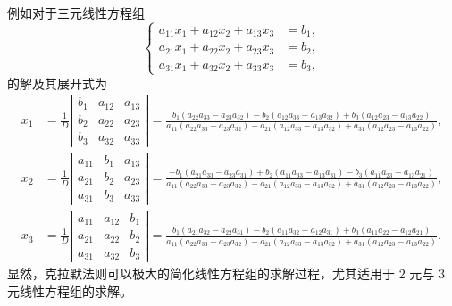 例如对于三元线性方程组
\begin{equation*}
    \left\{ \begin{aligned}
        a_{11} x_1 + a_{12} x_2 + a_{13} x_3 & = b_1 , \\
        a_{21} x_1 + a_{22} x_2 + a_{23} x_3 & = b_2 , \\
        a_{31} x_1 + a_{32} x_2 + a_{33} x_3 & = b_3 ,
    \end{aligned} \right.
\end{equation*}
的解及其展开式为
\begin{equation*}
    \begin{aligned}
        x_1 & = \frac{1}{D} \left| \begin{array}{ccc}
                                       b_1 & a_{12} & a_{13} \\
                                       b_2 & a_{22} & a_{23} \\
                                       b_3 & a_{32} & a_{33}
                                   \end{array} \right| = \frac{b_1 (a_{22} a_{33} - a_{23} a_{32}) - b_2 (a_{12} a_{33} - a_{13} a_{32}) + b_3 (a_{12} a_{23} - a_{13} a_{22})}{a_{11} (a_{22} a_{33} - a_{23} a_{32}) - a_{21} (a_{12} a_{33} - a_{13} a_{32}) + a_{31} (a_{12} a_{23} - a_{13} a_{22})} ,  \\
        x_2 & = \frac{1}{D} \left| \begin{array}{ccc}
                                       a_{11} & b_1 & a_{13} \\
                                       a_{21} & b_2 & a_{23} \\
                                       a_{31} & b_3 & a_{33}
                                   \end{array} \right| = \frac{-b_1 (a_{21} a_{33} - a_{23} a_{31}) + b_2 (a_{11} a_{33} - a_{13} a_{31}) - b_3 (a_{11} a_{23} - a_{13} a_{21})}{a_{11} (a_{22} a_{33} - a_{23} a_{32}) - a_{21} (a_{12} a_{33} - a_{13} a_{32}) + a_{31} (a_{12} a_{23} - a_{13} a_{22})} , \\
        x_3 & = \frac{1}{D} \left| \begin{array}{ccc}
                                       a_{11} & a_{12} & b_1 \\
                                       a_{21} & a_{22} & b_2 \\
                                       a_{31} & a_{32} & b_3
                                   \end{array} \right| = \frac{b_1 (a_{21} a_{32} - a_{22} a_{31}) - b_2 (a_{11} a_{32} - a_{12} a_{31}) + b_3 (a_{11} a_{22} - a_{12} a_{21})}{a_{11} (a_{22} a_{33} - a_{23} a_{32}) - a_{21} (a_{12} a_{33} - a_{13} a_{32}) + a_{31} (a_{12} a_{23} - a_{13} a_{22})} .
    \end{aligned}
\end{equation*}
显然，克拉默法则可以极大的简化线性方程组的求解过程，尤其适用于 $ 2 $ 元与 $ 3 $ 元线性方程组的求解。

